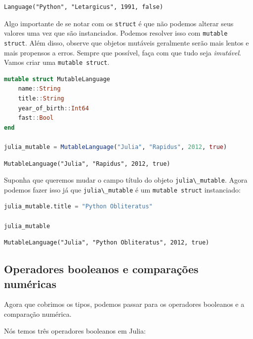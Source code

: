 \documentclass[
  notoc %
]{tufte-book}
\newcommand{\passthrough}[1]{#1}
\begin{document}
\begin{lstlisting}[language=Output]
Language("Python", "Letargicus", 1991, false)
\end{lstlisting}

Algo importante de se notar com os \passthrough{\lstinline!struct!} é
que não podemos alterar seus valores uma vez que são instanciados.
Podemos resolver isso com \passthrough{\lstinline!mutable struct!}. Além
disso, observe que objetos mutáveis geralmente serão mais lentos e mais
propensos a erros. Sempre que possível, faça com que tudo seja
\emph{imutável}. Vamos criar uma
\passthrough{\lstinline!mutable struct!}.

\begin{lstlisting}[language=Julia]
mutable struct MutableLanguage
    name::String
    title::String
    year_of_birth::Int64
    fast::Bool
end

julia_mutable = MutableLanguage("Julia", "Rapidus", 2012, true)
\end{lstlisting}

\begin{lstlisting}[language=Output]
MutableLanguage("Julia", "Rapidus", 2012, true)
\end{lstlisting}

Suponha que queremos mudar o campo título do objeto
\passthrough{\lstinline!julia\_mutable!}. Agora podemos fazer isso já
que \passthrough{\lstinline!julia\_mutable!} é um
\passthrough{\lstinline!mutable struct!} instanciado:

\begin{lstlisting}[language=Julia]
julia_mutable.title = "Python Obliteratus"

julia_mutable
\end{lstlisting}

\begin{lstlisting}[language=Output]
MutableLanguage("Julia", "Python Obliteratus", 2012, true)
\end{lstlisting}

\hypertarget{operadores-booleanos-e-comparauxe7uxf5es-numuxe9ricas}{%
\subsection{Operadores booleanos e comparações
numéricas}\label{operadores-booleanos-e-comparauxe7uxf5es-numuxe9ricas}}

Agora que cobrimos os tipos, podemos passar para os operadores booleanos
e a comparação numérica.

Nós temos três operadores booleanos em Julia:
\end{document}
